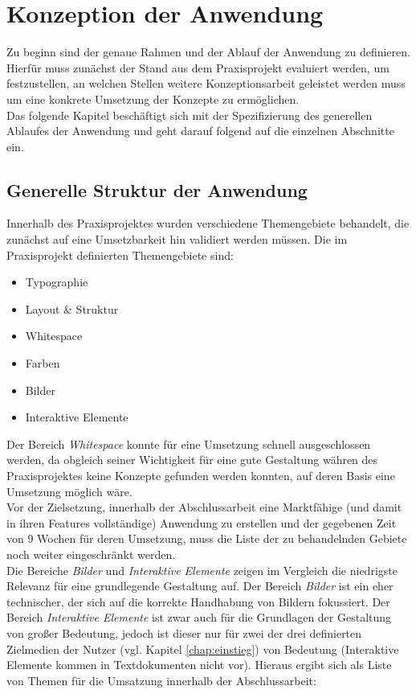 \chapter{Konzeption der Anwendung}
\thispagestyle{fancy}

Zu beginn sind der genaue Rahmen und der Ablauf der Anwendung zu definieren. Hierfür muss zunächst der Stand aus dem Praxisprojekt evaluiert werden, um festzustellen, an welchen Stellen weitere Konzeptionsarbeit geleistet werden muss um eine konkrete Umsetzung der Konzepte zu ermöglichen.\\
Das folgende Kapitel beschäftigt sich mit der Spezifizierung des generellen Ablaufes der Anwendung und geht darauf folgend auf die einzelnen Abschnitte ein.

\section{Generelle Struktur der Anwendung}
Innerhalb des Praxisprojektes wurden verschiedene Themengebiete behandelt, die zunächst auf eine Umsetzbarkeit hin validiert werden müssen. Die im Praxisprojekt definierten Themengebiete \cite{PoplawskiPP} sind:

\begin{itemize}
  \item Typographie
  \item Layout \& Struktur
  \item Whitespace
  \item Farben
  \item Bilder
  \item Interaktive Elemente
\end{itemize}

Der Bereich \textit{Whitespace} konnte für eine Umsetzung schnell ausgeschlossen werden, da obgleich seiner Wichtigkeit für eine gute Gestaltung währen des Praxisprojektes keine Konzepte gefunden werden konnten, auf deren Basis eine Umsetzung möglich wäre.\\
Vor der Zielsetzung, innerhalb der Abschlussarbeit eine Marktfähige (und damit in ihren Features vollständige) Anwendung zu erstellen und der gegebenen Zeit von 9 Wochen für deren Umsetzung, muss die Liste der zu behandelnden Gebiete noch weiter eingeschränkt werden.\\
Die Bereiche \textit{Bilder} und \textit{Interaktive Elemente} zeigen im Vergleich die niedrigste Relevanz für eine grundlegende Gestaltung auf. Der Bereich \textit{Bilder} ist ein eher technischer, der sich auf die korrekte Handhabung von Bildern fokussiert. Der Bereich \textit{Interaktive Elemente} ist zwar auch für die Grundlagen der Gestaltung von großer Bedeutung, jedoch ist dieser nur für zwei der drei definierten Zielmedien der Nutzer (vgl. Kapitel \ref{chap:einstieg}) von Bedeutung (Interaktive Elemente kommen in Textdokumenten nicht vor). Hieraus ergibt sich als Liste von Themen für die Umsatzung innerhalb der Abschlussarbeit:

